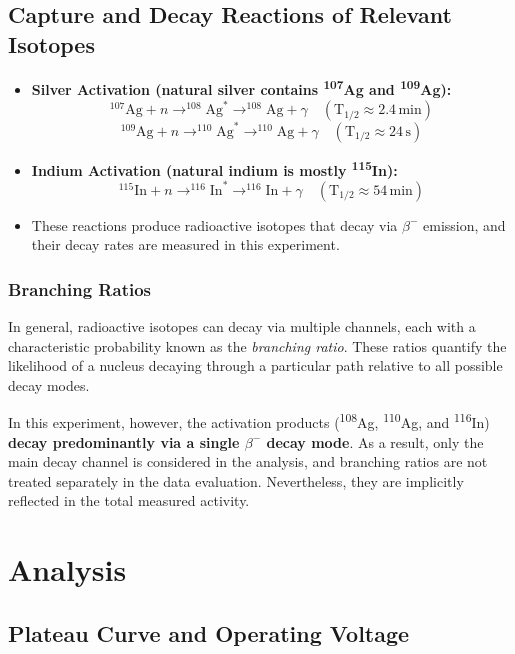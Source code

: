 \documentclass[12pt,a4paper]{article}
\begin{document}
\subsection{Capture and Decay Reactions of Relevant Isotopes}

\begin{itemize}
  \item \textbf{Silver Activation (natural silver contains \textsuperscript{107}Ag and \textsuperscript{109}Ag):}
  \[
  ^{107}\mathrm{Ag} + n \rightarrow ^{108}\mathrm{Ag}^* \rightarrow ^{108}\mathrm{Ag} + \gamma \quad (\text{T}_{1/2} \approx 2.4 \, \text{min})
  \]
  \[
  ^{109}\mathrm{Ag} + n \rightarrow ^{110}\mathrm{Ag}^* \rightarrow ^{110}\mathrm{Ag} + \gamma \quad (\text{T}_{1/2} \approx 24 \, \text{s})
  \]

  \item \textbf{Indium Activation (natural indium is mostly \textsuperscript{115}In):}
  \[
  ^{115}\mathrm{In} + n \rightarrow ^{116}\mathrm{In}^* \rightarrow ^{116}\mathrm{In} + \gamma \quad (\text{T}_{1/2} \approx 54 \, \text{min})
  \]

  \item These reactions produce radioactive isotopes that decay via $\beta^-$ emission, and their decay rates are measured in this experiment.
\end{itemize}
\subsubsection*{Branching Ratios}

In general, radioactive isotopes can decay via multiple channels, each with a characteristic probability known as the \textit{branching ratio}. These ratios quantify the likelihood of a nucleus decaying through a particular path relative to all possible decay modes. 

In this experiment, however, the activation products (\textsuperscript{108}Ag, \textsuperscript{110}Ag, and \textsuperscript{116}In) \textbf{decay predominantly via a single $\beta^-$ decay mode}. As a result, only the main decay channel is considered in the analysis, and branching ratios are not treated separately in the data evaluation. Nevertheless, they are implicitly reflected in the total measured activity.

\section{Analysis}
\subsection{Plateau Curve and Operating Voltage}
\end{document}
